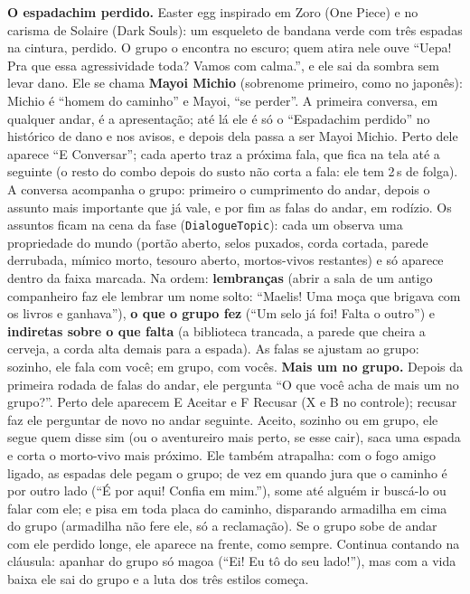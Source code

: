 \documentclass[11pt,a4paper]{article}
\begin{document}
\textbf{O espadachim perdido.} Easter egg inspirado em Zoro (One Piece) e no carisma de Solaire (Dark Souls): um esqueleto de bandana verde com três espadas na cintura, perdido. O grupo o encontra no escuro; quem atira nele ouve ``Uepa! Pra que essa agressividade toda? Vamos com calma.'', e ele sai da sombra sem levar dano. Ele se chama \textbf{Mayoi Michio} (sobrenome primeiro, como no japonês): Michio é ``homem do caminho'' e Mayoi, ``se perder''. A primeira conversa, em qualquer andar, é a apresentação; até lá ele é só o ``Espadachim perdido'' no histórico de dano e nos avisos, e depois dela passa a ser Mayoi Michio. Perto dele aparece ``E Conversar''; cada aperto traz a próxima fala, que fica na tela até a seguinte (o resto do combo depois do susto não corta a fala: ele tem 2\,s de folga). A conversa acompanha o grupo: primeiro o cumprimento do andar, depois o assunto mais importante que já vale, e por fim as falas do andar, em rodízio. Os assuntos ficam na cena da fase (\texttt{DialogueTopic}): cada um observa uma propriedade do mundo (portão aberto, selos puxados, corda cortada, parede derrubada, mímico morto, tesouro aberto, mortos-vivos restantes) e só aparece dentro da faixa marcada. Na ordem: \textbf{lembranças} (abrir a sala de um antigo companheiro faz ele lembrar um nome solto: ``Maelis! Uma moça que brigava com os livros e ganhava''), \textbf{o que o grupo fez} (``Um selo já foi! Falta o outro'') e \textbf{indiretas sobre o que falta} (a biblioteca trancada, a parede que cheira a cerveja, a corda alta demais para a espada). As falas se ajustam ao grupo: sozinho, ele fala com você; em grupo, com vocês. \textbf{Mais um no grupo.} Depois da primeira rodada de falas do andar, ele pergunta ``O que você acha de mais um no grupo?''. Perto dele aparecem E Aceitar e F Recusar (X e B no controle); recusar faz ele perguntar de novo no andar seguinte. Aceito, sozinho ou em grupo, ele segue quem disse sim (ou o aventureiro mais perto, se esse cair), saca uma espada e corta o morto-vivo mais próximo. Ele também atrapalha: com o fogo amigo ligado, as espadas dele pegam o grupo; de vez em quando jura que o caminho é por outro lado (``É por aqui! Confia em mim.''), some até alguém ir buscá-lo ou falar com ele; e pisa em toda placa do caminho, disparando armadilha em cima do grupo (armadilha não fere ele, só a reclamação). Se o grupo sobe de andar com ele perdido longe, ele aparece na frente, como sempre. Continua contando na cláusula: apanhar do grupo só magoa (``Ei! Eu tô do seu lado!''), mas com a vida baixa ele sai do grupo e a luta dos três estilos começa.
\end{document}
